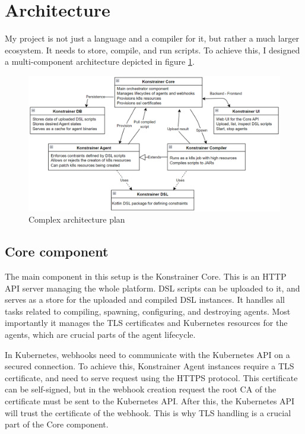 \clearpage\section{Architecture}

My project is not just a language and a compiler for it, but rather a much larger ecosystem. It needs to store, compile, and run scripts. To achieve this, I designed a multi-component architecture depicted in figure \ref{fig:comp_arch}.

\begin{figure}[h]
    \centering
    \includegraphics[width=130mm, keepaspectratio]{content/75_implementation/xarch.png}
    \caption{Complex architecture plan}
    \label{fig:comp_arch}
\end{figure}

\subsection{Core component}

The main component in this setup is the Konstrainer Core. This is an HTTP API server managing the whole platform. DSL scripts can be uploaded to it, and serves as a store for the uploaded and compiled DSL instances. It handles all tasks related to compiling, spawning, configuring, and destroying agents. Most importantly it manages the TLS certificates and Kubernetes resources for the agents, which are crucial parts of the agent lifecycle.

In Kubernetes, webhooks need to communicate with the Kubernetes API on a secured connection. To achieve this, Konstrainer Agent instances require a TLS certificate, and need to serve request using the HTTPS protocol. This certificate can be self-signed, but in the webhook creation request the root CA of the certificate must be sent to the Kubernetes API. After this, the Kubernetes API will trust the certificate of the webhook. This is why TLS handling is a crucial part of the Core component.

